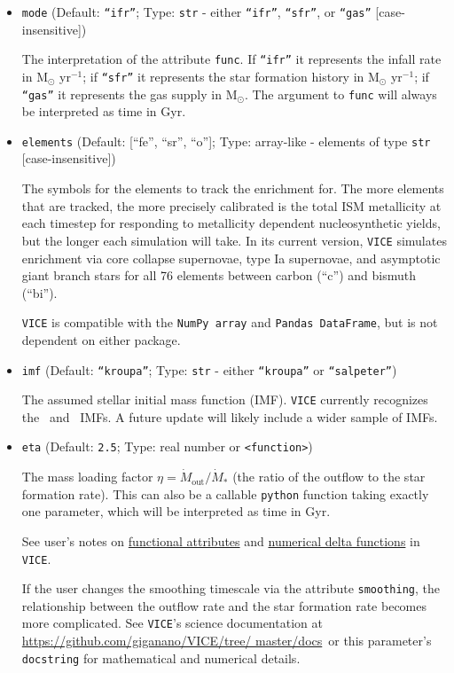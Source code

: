 \documentclass{report}
\newcommand{\docsdir}{\url{https://github.com/giganano/VICE/tree/
master/docs}}
\begin{document}
\begin{itemize}
	\item{ %
		\texttt{mode} (Default: \texttt{``ifr''}; Type: \texttt{str} - either 
		\texttt{``ifr''}, \texttt{``sfr''}, or \texttt{``gas''} 
		[case-insensitive]) 
		\par
		The interpretation of the attribute \texttt{func}. If \texttt{``ifr''} 
		it represents the infall rate in M$_\odot$ yr$^{-1}$; if 
		\texttt{``sfr''} it represents the star formation history in 
		M$_\odot$ yr$^{-1}$; if \texttt{``gas''} it represents the gas supply 
		in M$_\odot$. The argument to \texttt{func} will always be interpreted 
		as time in Gyr. 
	}

	\item{ %
		\texttt{elements} (Default: [``fe'', ``sr'', ``o'']; Type: array-like 
		- elements of type \texttt{str} [case-insensitive]) 
		\par
		The symbols for the elements to track the enrichment for. The more 
		elements that are tracked, the more precisely calibrated is the total 
		ISM metallicity at each timestep for responding to metallicity 
		dependent nucleosynthetic yields, but the longer each simulation will 
		take. In its current version, \texttt{VICE} simulates enrichment via 
		core collapse supernovae, type Ia supernovae, and asymptotic giant 
		branch stars for all 76 elements between carbon (``c'') and bismuth 
		(``bi''). 
		\par
		\texttt{VICE} is compatible with the \texttt{NumPy array} and 
		\texttt{Pandas DataFrame}, but is not dependent on either package. 
	}

	\item{ %
		\texttt{imf} (Default: \texttt{``kroupa''}; Type: \texttt{str} - 
		either \texttt{``kroupa''} or \texttt{``salpeter''}) 
		\par
		The assumed stellar initial mass function (IMF). \texttt{VICE} 
		currently recognizes the~\citet{Kroupa2001} and~\citet{Salpeter1955} 
		IMFs. A future update will likely include a wider sample of IMFs. 
	}

	\item{ %
		\texttt{eta} (Default: \texttt{2.5}; Type: real number or 
		\texttt{<function>}) 
		\par 
		The mass loading factor $\eta = \dot{M}_\text{out}/\dot{M}_*$ (the 
		ratio of the outflow to the star formation rate). This can also be a 
		callable \texttt{python} function taking exactly one parameter, which 
		will be interpreted as time in Gyr. 
		\par
		See user's notes on \hyperlink{note:pyfuncs}{functional attributes} 
		and  \hyperlink{note:delta_funcs}{numerical delta functions} in 
		\texttt{VICE}. 
		\par
		If the user changes the smoothing timescale via the attribute 
		\texttt{smoothing}, the relationship between the outflow rate and the 
		star formation rate becomes more complicated. See \texttt{VICE}'s 
		science documentation at \docsdir~or this parameter's 
		\texttt{docstring} for mathematical and numerical details. 
	}


\end{itemize}
\end{document}
